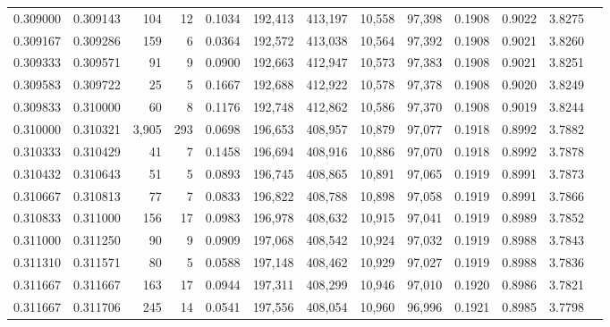 \begin{tabular}{rrrrrrrrrrrrr}
0.309000 & 0.309143 &   104 &  12 &                                     0.1034 & 192,413 & 413,197 &  10,558 &  97,398 & 0.1908 & 0.9022 & 3.8275 \\
0.309167 & 0.309286 &   159 &   6 &                                     0.0364 & 192,572 & 413,038 &  10,564 &  97,392 & 0.1908 & 0.9021 & 3.8260 \\
0.309333 & 0.309571 &    91 &   9 &                                     0.0900 & 192,663 & 412,947 &  10,573 &  97,383 & 0.1908 & 0.9021 & 3.8251 \\
0.309583 & 0.309722 &    25 &   5 &                                     0.1667 & 192,688 & 412,922 &  10,578 &  97,378 & 0.1908 & 0.9020 & 3.8249 \\
0.309833 & 0.310000 &    60 &   8 &                                     0.1176 & 192,748 & 412,862 &  10,586 &  97,370 & 0.1908 & 0.9019 & 3.8244 \\
0.310000 & 0.310321 & 3,905 & 293 &                                     0.0698 & 196,653 & 408,957 &  10,879 &  97,077 & 0.1918 & 0.8992 & 3.7882 \\
0.310333 & 0.310429 &    41 &   7 &                                     0.1458 & 196,694 & 408,916 &  10,886 &  97,070 & 0.1918 & 0.8992 & 3.7878 \\
0.310432 & 0.310643 &    51 &   5 &                                     0.0893 & 196,745 & 408,865 &  10,891 &  97,065 & 0.1919 & 0.8991 & 3.7873 \\
0.310667 & 0.310813 &    77 &   7 &                                     0.0833 & 196,822 & 408,788 &  10,898 &  97,058 & 0.1919 & 0.8991 & 3.7866 \\
0.310833 & 0.311000 &   156 &  17 &                                     0.0983 & 196,978 & 408,632 &  10,915 &  97,041 & 0.1919 & 0.8989 & 3.7852 \\
0.311000 & 0.311250 &    90 &   9 &                                     0.0909 & 197,068 & 408,542 &  10,924 &  97,032 & 0.1919 & 0.8988 & 3.7843 \\
0.311310 & 0.311571 &    80 &   5 &                                     0.0588 & 197,148 & 408,462 &  10,929 &  97,027 & 0.1919 & 0.8988 & 3.7836 \\
0.311667 & 0.311667 &   163 &  17 &                                     0.0944 & 197,311 & 408,299 &  10,946 &  97,010 & 0.1920 & 0.8986 & 3.7821 \\
0.311667 & 0.311706 &   245 &  14 &                                     0.0541 & 197,556 & 408,054 &  10,960 &  96,996 & 0.1921 & 0.8985 & 3.7798 \\

\end{tabular}
